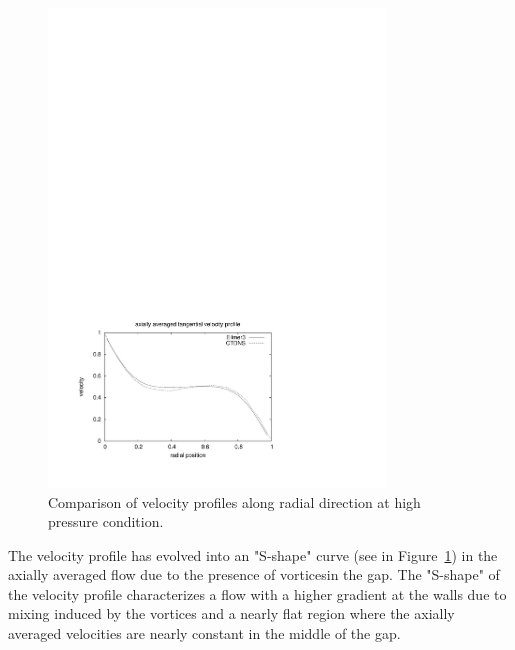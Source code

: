 \begin{figure}[htbp]
\begin{center}
\includegraphics[width=0.8\textwidth,viewport=41 50 407 303,clip=true]{../3D/taylor-couette/velocity-high.pdf}
\end{center}
\caption{Comparison of velocity profiles along radial direction at high pressure condition.}
\label{tch-velocity-fig}
\end{figure}

\medskip
The velocity profile has evolved into an "S-shape" curve (see in Figure~\ref{tch-velocity-fig}) in the axially averaged 
flow due to the presence of vorticesin the gap. The "S-shape" of the velocity profile characterizes a flow with a higher 
gradient at the walls due to mixing induced by the vortices and a nearly flat region where the axially averaged velocities 
are nearly constant in the middle of the gap.

